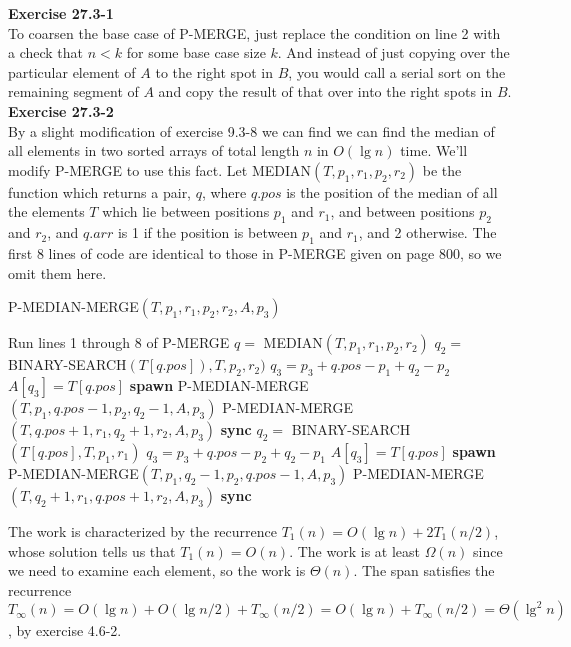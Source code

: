 \documentclass{article}
\begin{document}
\noindent\textbf{Exercise 27.3-1}\\

To coarsen the base case of P-MERGE, just replace the condition on line 2 with a check that $n<k$ for some base case size $k$. And instead of just copying over the particular element of $A$ to the right spot in $B$,  you would call a serial sort on the remaining segment of $A$ and copy the result of that over into the right spots in $B$.\\

\noindent\textbf{Exercise 27.3-2}\\

By a slight modification of exercise 9.3-8 we can find we can find the median of all elements in two sorted arrays of total length $n$ in $O(\lg n)$ time.  We'll modify P-MERGE to use this fact.  Let MEDIAN$(T,p_1,r_1,p_2,r_2)$ be the function which returns a pair, $q$, where $q.pos$ is the position of the median of all the elements $T$ which lie between positions $p_1$ and $r_1$, and between positions $p_2$ and $r_2$, and $q.arr$ is 1 if the position is between $p_1$ and $r_1$, and 2 otherwise.  The first 8 lines of code are identical to those in P-MERGE given on page 800, so we omit them here.\\

\begin{algorithm}
\caption{P-MEDIAN-MERGE$(T,p_1,r_1,p_2,r_2,A,p_3)$}
\begin{algorithmic}[1]
\State Run lines 1 through 8 of P-MERGE
\State $q =$  MEDIAN$(T,p_1,r_1,p_2,r_2)$
	\State $q_2 = $ BINARY-SEARCH$(T[q.pos]), T, p_2, r_2)$
	\State $q_3 = p_3 + q.pos - p_1 + q_2 - p_2$
	\State $A[q_3] = T[q.pos]$
	\State \textbf{spawn} P-MEDIAN-MERGE$(T, p_1, q.pos - 1, p_2, q_2 - 1, A,p_3)$
	\State P-MEDIAN-MERGE$(T, q.pos + 1, r_1, q_2 + 1, r_2, A,p_3)$
	\State \textbf{sync}
\Else
	\State $q_2 = $ BINARY-SEARCH$(T[q.pos],T,p_1,r_1)$
	\State $q_3 = p_3 + q.pos - p_2 + q_2 - p_1$
	\State $A[q_3] = T[q.pos]$
	\State \textbf{spawn} P-MEDIAN-MERGE$(T, p_1, q_2 - 1, p_2, q.pos - 1, A,p_3)$
	\State P-MEDIAN-MERGE$(T, q_2 + 1, r_1, q.pos + 1, r_2, A,p_3)$
	\State \textbf{sync}
\EndIf
\end{algorithmic}
\end{algorithm}

The work is characterized by the recurrence $T_1(n) = O(\lg n) + 2T_1(n/2)$, whose solution tells us that $T_1(n) = O(n)$.  The work is at least $\Omega(n)$ since we need to examine each element, so the work is $\Theta(n)$.  The span satisfies the recurrence $T_\infty(n) = O(\lg n) + O(\lg n/2) + T_\infty(n/2) = O(\lg n) + T_\infty(n/2) = \Theta(\lg^2 n)$, by exercise 4.6-2. \\  
\end{document}
